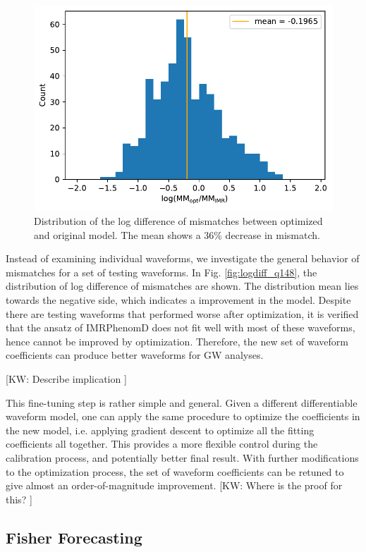 \documentclass[twocolumn]{aastex631}
\newcommand{\kw}[1]{{\color{rb4}[KW: #1 ]}}
\begin{document}
\begin{figure}[t]
\centering
\includegraphics[width=\linewidth]{../static/MM_logdiff_q148_LIGO.pdf}
\caption{Distribution of the log difference of mismatches between optimized
    and original model. The mean shows a 36\% decrease in mismatch. }
\label{fig:MM_logdiff}
\end{figure}

Instead of examining individual waveforms, we investigate the general behavior of mismatches for a set of testing waveforms. 
In Fig. \ref{fig:logdiff_q148}, the distribution of log difference of mismatches are shown. 
The distribution mean lies towards the negative side, which indicates a improvement in the model. 
Despite there are testing waveforms that performed worse after optimization, it is verified that the ansatz of IMRPhenomD does not fit well with most of these waveforms, hence cannot be improved by optimization.  
Therefore, the new set of waveform coefficients can produce better waveforms for GW analyses. 

\kw{Describe implication}

This fine-tuning step is rather simple and general. Given a different
differentiable waveform model, one can apply the same procedure to optimize the
coefficients in the new model, i.e. applying gradient descent to optimize all
the fitting coefficients all together. This provides a more flexible control
during the calibration process, and potentially better final result.
With further modifications to the optimization process, the set of waveform
coefficients can be retuned to give almost an order-of-magnitude improvement.
\kw{Where is the proof for this?} 
\subsection{Fisher Forecasting}
\label{subsec:fisher}
\end{document}
